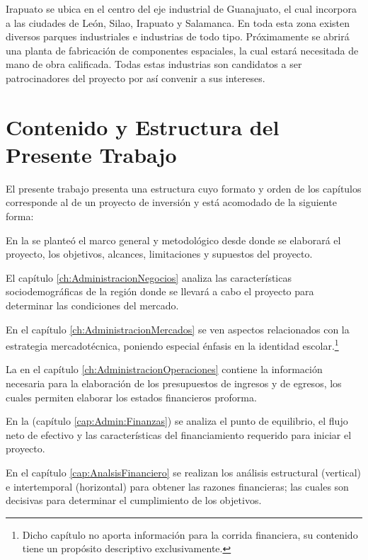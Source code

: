 Irapuato se ubica en el centro del eje industrial de Guanajuato, el cual incorpora a las ciudades de León, Silao, Irapuato y Salamanca. En toda esta zona existen diversos parques industriales e industrias de todo tipo. Próximamente se abrirá una planta de fabricación de componentes espaciales, la cual estará necesitada de mano de obra calificada. Todas estas industrias son candidatos a ser patrocinadores del proyecto por así convenir a sus intereses.

\section{Contenido y Estructura del Presente Trabajo}
\label{sec:Intro:ContenidoYEstructura}

El presente trabajo presenta una estructura cuyo formato y orden de los capítulos corresponde al de un proyecto de inversión y está acomodado de la siguiente forma:

En la \emph{} se planteó el marco general y metodológico desde donde se elaborará el proyecto, los objetivos, alcances, limitaciones y supuestos del proyecto.

El capítulo \ref{ch:AdministracionNegocios} \emph{} analiza las características sociodemográficas de la región donde se llevará a cabo el proyecto para determinar las condiciones del mercado.

En el capítulo \ref{ch:AdministracionMercados} \emph{} se ven aspectos relacionados con la estrategia mercadotécnica, poniendo especial énfasis en la identidad escolar.\footnote{Dicho capítulo no aporta información para la corrida financiera, su contenido tiene un propósito descriptivo exclusivamente.}

La \emph{} en el capítulo \ref{ch:AdministracionOperaciones} contiene la información necesaria para la elaboración de los presupuestos de ingresos y de egresos, los cuales permiten elaborar los estados financieros proforma.

En la \emph{} (capítulo \ref{cap:Admin:Finanzas}) se analiza el punto de equilibrio, el flujo neto de efectivo y las características del financiamiento requerido para iniciar el proyecto.

En el capítulo \ref{cap:AnalsisFinanciero} \emph{} se realizan los análisis estructural (vertical) e intertemporal (horizontal) para obtener las razones financieras; las cuales son decisivas para determinar el cumplimiento de los objetivos.


